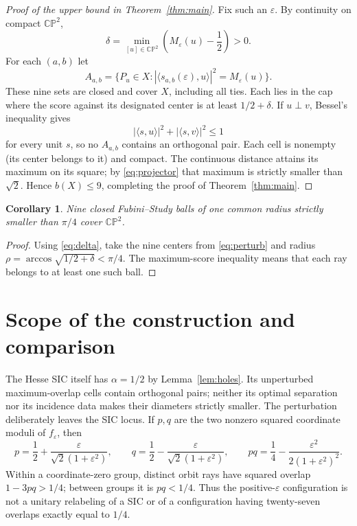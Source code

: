 \documentclass[11pt,a4paper]{article}
\newtheorem{corollary}[theorem]{Corollary}
\theoremstyle{remark}
\numberwithin{equation}{section}
\newcommand{\CP}{\mathbb{CP}}
\newcommand{\ip}[2]{\langle #1,#2\rangle}
\begin{document}
\begin{proof}[Proof of the upper bound in Theorem~\ref{thm:main}]
Fix such an $\varepsilon$. By continuity on compact $\CP^2$,
\begin{equation}\label{eq:delta}
 \delta=\min_{[u]\in\CP^2}\left(M_\varepsilon(u)-\frac12\right)>0.
\end{equation}
For each $(a,b)$ let
\begin{equation}\label{eq:cells}
 A_{a,b}=\{P_u\in X:|\ip{s_{a,b}(\varepsilon)}u|^2=M_\varepsilon(u)\}.
\end{equation}
These nine sets are closed and cover $X$, including all ties. Each lies in the cap where the score against its designated center is at least $1/2+\delta$. If $u\perp v$, Bessel's inequality gives
\[
 |\ip su|^2+|\ip sv|^2\le1
\]
for every unit $s$, so no $A_{a,b}$ contains an orthogonal pair. Each cell is nonempty (its center belongs to it) and compact. The continuous distance attains its maximum on its square; by \eqref{eq:projector} that maximum is strictly smaller than $\sqrt2$. Hence $b(X)\le9$, completing the proof of Theorem~\ref{thm:main}.
\end{proof}

\begin{corollary}\label{cor:balls}
Nine closed Fubini--Study balls of one common radius strictly smaller than $\pi/4$ cover $\CP^2$.
\end{corollary}
\begin{proof}
Using \eqref{eq:delta}, take the nine centers from \eqref{eq:perturb} and radius $\rho=\arccos\sqrt{1/2+\delta}<\pi/4$. The maximum-score inequality means that each ray belongs to at least one such ball.
\end{proof}

\section{Scope of the construction and comparison}\label{sec:comparison}
The Hesse SIC itself has $\alpha=1/2$ by Lemma~\ref{lem:holes}. Its unperturbed maximum-overlap cells contain orthogonal pairs; neither its optimal separation nor its incidence data makes their diameters strictly smaller. The perturbation deliberately leaves the SIC locus. If $p,q$ are the two nonzero squared coordinate moduli of $f_\varepsilon$, then
\[
 p=\frac12+\frac{\varepsilon}{\sqrt2(1+\varepsilon^2)},\qquad
 q=\frac12-\frac{\varepsilon}{\sqrt2(1+\varepsilon^2)},\qquad
 pq=\frac14-\frac{\varepsilon^2}{2(1+\varepsilon^2)^2}.
\]
Within a coordinate-zero group, distinct orbit rays have squared overlap $1-3pq>1/4$; between groups it is $pq<1/4$. Thus the positive-$\varepsilon$ configuration is not a unitary relabeling of a SIC or of a configuration having twenty-seven overlaps exactly equal to $1/4$.
\end{document}
